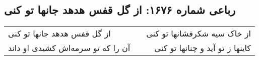 \begin{center}
\section*{رباعی شماره ۱۶۷۶: از گل قفس هدهد جانها تو کنی}
\label{sec:1676}
\begin{longtable}{l p{0.5cm} r}
از گل قفس هدهد جانها تو کنی
&&
از خاک سیه شکرفشانها تو کنی
\\
آن را که تو سرمه‌اش کشیدی او داند
&&
کاینها ز تو آید و چنانها تو کنی
\\
\end{longtable}
\end{center}

